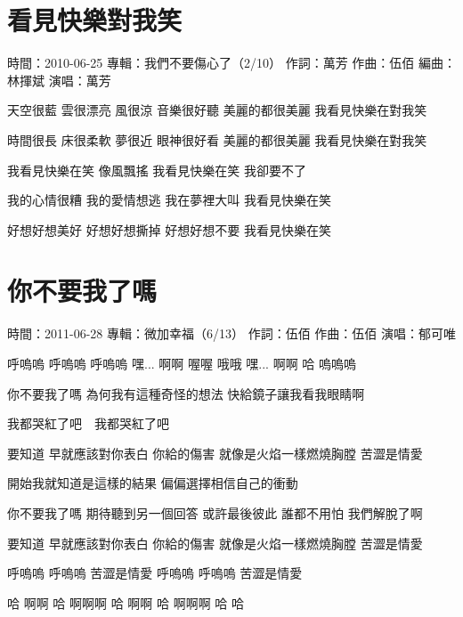 \documentclass[UTF8,a4paper,oneside,twocolumn,12pt]{ctexbook}
\newcommand{\infopair}[2]{\textbullet #1：#2}
\newcommand{\zc}[1][伍佰]{\infopair{作詞}{#1}}
\newcommand{\zq}[1][伍佰]{\infopair{作曲}{#1}}
\newcommand{\bq}[1][伍佰]{\infopair{編曲}{#1}}
\newcommand{\zj}[1]{\infopair{專輯}{#1}}
\newcommand{\sj}[1]{\infopair{時間}{#1}}
\newenvironment{info}{\begin{flushleft}\kaishu
	}
	{\end{flushleft}\normalsize\yahei\par}
\newenvironment{lyric}{
	}
{}
\begin{document}
\section{看見快樂對我笑}
\begin{info}
	\sj{2010-06-25}
	\zj{我們不要傷心了（2/10）}
	\zc[萬芳]
	\zq
	\bq[林揮斌]
	\infopair{演唱}{萬芳}
\end{info}
\begin{lyric}
	天空很藍    雲很漂亮
	風很涼    音樂很好聽
	美麗的都很美麗
	我看見快樂在對我笑

	時間很長    床很柔軟
	夢很近    眼神很好看
	美麗的都很美麗
	我看見快樂在對我笑

	我看見快樂在笑
	像風飄搖
	我看見快樂在笑
	我卻要不了

	我的心情很糟  我的愛情想逃
	我在夢裡大叫  我看見快樂在笑

	好想好想美好  好想好想撕掉
	好想好想不要  我看見快樂在笑
\end{lyric}

\section{你不要我了嗎}
\begin{info}
	\sj{2011-06-28}
	\zj{微加幸福（6/13）}
	\zc
	\zq
	\infopair{演唱}{郁可唯}
\end{info}
\begin{lyric}
	呼嗚嗚 呼嗚嗚 呼嗚嗚
	嘿... 啊啊 喔喔 哦哦
	嘿... 啊啊 哈 嗚嗚嗚

	你不要我了嗎  為何我有這種奇怪的想法
	快給鏡子讓我看我眼睛啊

	我都哭紅了吧　我都哭紅了吧

	要知道 早就應該對你表白
	你給的傷害 就像是火焰一樣燃燒胸膛 苦澀是情愛

	開始我就知道是這樣的結果
	偏偏選擇相信自己的衝動

	你不要我了嗎  期待聽到另一個回答
	或許最後彼此  誰都不用怕  我們解脫了啊

	要知道 早就應該對你表白
	你給的傷害 就像是火焰一樣燃燒胸膛 苦澀是情愛

	呼嗚嗚 呼嗚嗚  苦澀是情愛
	呼嗚嗚 呼嗚嗚  苦澀是情愛

	哈 啊啊 哈 啊啊啊
	哈 啊啊 哈 啊啊啊 哈 哈
\end{lyric}
\end{document}
